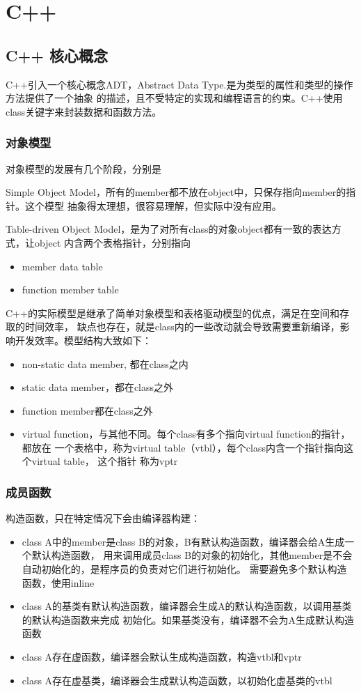 \chapter{C++}

\section{ C++ 核心概念 }
C++引入一个核心概念ADT，Abstract Data Type.是为类型的属性和类型的操作方法提供了一个抽象
的描述，且不受特定的实现和编程语言的约束。C++使用class关键字来封装数据和函数方法。

\subsection{对象模型}
对象模型的发展有几个阶段，分别是

Simple Object Model，所有的member都不放在object中，只保存指向member的指针。这个模型
抽象得太理想，很容易理解，但实际中没有应用。

Table-driven Object Model，是为了对所有class的对象object都有一致的表达方式，让object
内含两个表格指针，分别指向
\begin{itemize}
    \item {member data table}
    \item {function member table}
\end{itemize}

C++的实际模型是继承了简单对象模型和表格驱动模型的优点，满足在空间和存取的时间效率，
缺点也存在，就是class内的一些改动就会导致需要重新编译，影响开发效率。模型结构大致如下：
\begin{itemize}
    \item {non-static data member, 都在class之内}
    \item {static data member，都在class之外}
    \item {function member都在class之外}
    \item {virtual function，与其他不同。每个class有多个指向virtual function的指针，都放在
    一个表格中，称为virtual table（vtbl），每个class内含一个指针指向这个virtual table， 这个指针
    称为vptr}
\end{itemize}

\subsection{成员函数}
构造函数，只在特定情况下会由编译器构建：
\begin{itemize}
    \item {class A中的member是class B的对象，B有默认构造函数，编译器会给A生成一个默认构造函数，
    用来调用成员class B的对象的初始化，其他member是不会自动初始化的，是程序员的负责对它们进行初始化。
    需要避免多个默认构造函数，使用inline}
    \item {class A的基类有默认构造函数，编译器会生成A的默认构造函数，以调用基类的默认构造函数来完成
    初始化。如果基类没有，编译器不会为A生成默认构造函数}
    \item {class A存在虚函数，编译器会默认生成构造函数，构造vtbl和vptr}
    \item {class A存在虚基类，编译器会生成默认构造函数，以初始化虚基类的vtbl}
\end{itemize}

